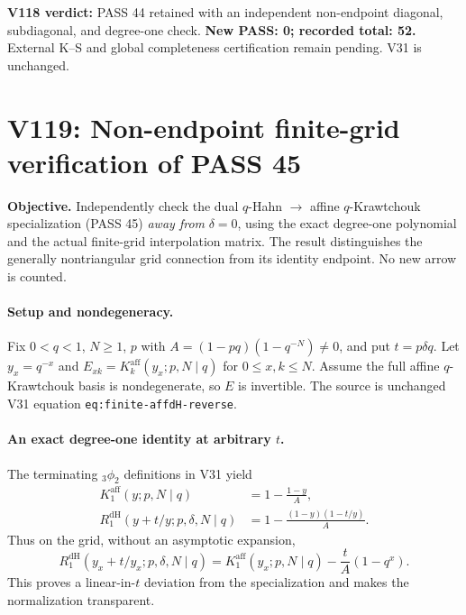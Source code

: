 \documentclass[11pt]{article}
\begin{document}
\noindent\textbf{V118 verdict:} PASS 44 retained with an independent non-endpoint diagonal, subdiagonal, and degree-one check. \textbf{New PASS: 0; recorded total: 52.} External K--S and global completeness certification remain pending. V31 is unchanged.



\clearpage
\section{V119: Non-endpoint finite-grid verification of PASS 45}
\noindent\textbf{Objective.} Independently check the dual $q$-Hahn $\to$ affine $q$-Krawtchouk specialization (PASS 45) \emph{away from} $\delta=0$, using the exact degree-one polynomial and the actual finite-grid interpolation matrix. The result distinguishes the generally nontriangular grid connection from its identity endpoint. No new arrow is counted.

\paragraph{Setup and nondegeneracy.} Fix $0<q<1$, $N\ge1$, $p$ with $A=(1-pq)(1-q^{-N})\ne0$, and put $t=p\delta q$. Let $y_x=q^{-x}$ and $E_{xk}=K_k^{\mathrm{aff}}(y_x;p,N\mid q)$ for $0\le x,k\le N$. Assume the full affine $q$-Krawtchouk basis is nondegenerate, so $E$ is invertible. The source is unchanged V31 equation \texttt{eq:finite-affdH-reverse}.

\paragraph{An exact degree-one identity at arbitrary $t$.} The terminating ${}_3\phi_2$ definitions in V31 yield
\begin{align*}
 K_1^{\mathrm{aff}}(y;p,N\mid q)&=1-\frac{1-y}{A},\\
 R_1^{\mathrm{dH}}(y+t/y;p,\delta,N\mid q)&=1-\frac{(1-y)(1-t/y)}{A}.
\end{align*}
Thus on the grid, without an asymptotic expansion,
\begin{equation}\label{eq:v119-exact-difference}
 \boxed{R_1^{\mathrm{dH}}(y_x+t/y_x;p,\delta,N\mid q)
 =K_1^{\mathrm{aff}}(y_x;p,N\mid q)-\frac{t}{A}(1-q^x).}
\end{equation}
This proves a linear-in-$t$ deviation from the specialization and makes the normalization transparent.
\end{document}
